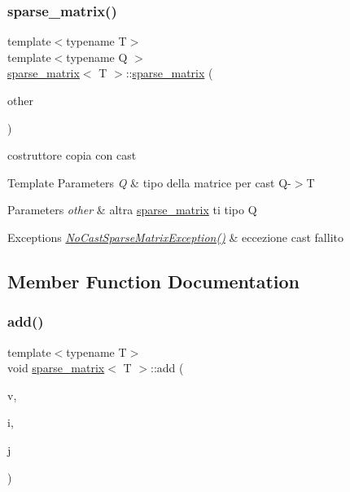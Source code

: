 \subsubsection{\texorpdfstring{sparse\+\_\+matrix()}{sparse\_matrix()}\hspace{0.1cm}{\footnotesize\ttfamily [4/4]}}
{\footnotesize\ttfamily template$<$typename T$>$ \\
template$<$typename Q $>$ \\
\hyperlink{classsparse__matrix}{sparse\+\_\+matrix}$<$ T $>$\+::\hyperlink{classsparse__matrix}{sparse\+\_\+matrix} (\begin{DoxyParamCaption}\item[{const \hyperlink{classsparse__matrix}{sparse\+\_\+matrix}$<$ Q $>$ \&}]{other }\end{DoxyParamCaption})\hspace{0.3cm}{\ttfamily [inline]}}



costruttore copia con cast 


\begin{DoxyTemplParams}{Template Parameters}
{\em Q} & tipo della matrice per cast Q-\/$>$T\\
\hline
\end{DoxyTemplParams}

\begin{DoxyParams}{Parameters}
{\em other} & altra \hyperlink{classsparse__matrix}{sparse\+\_\+matrix} ti tipo Q\\
\hline
\end{DoxyParams}

\begin{DoxyExceptions}{Exceptions}
{\em \hyperlink{classNoCastSparseMatrixException}{No\+Cast\+Sparse\+Matrix\+Exception()}} & eccezione cast fallito \\
\hline
\end{DoxyExceptions}


\subsection{Member Function Documentation}
\mbox{\label{classsparse__matrix_a3d41cd3cf849711e8074e5622f722009}} 
\subsubsection{\texorpdfstring{add()}{add()}}
{\footnotesize\ttfamily template$<$typename T$>$ \\
void \hyperlink{classsparse__matrix}{sparse\+\_\+matrix}$<$ T $>$\+::add (\begin{DoxyParamCaption}\item[{const T \&}]{v,  }\item[{const unsigned int}]{i,  }\item[{const unsigned int}]{j }\end{DoxyParamCaption})\hspace{0.3cm}{\ttfamily [inline]}}



